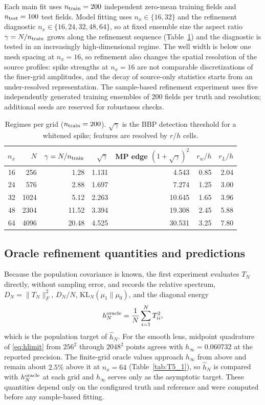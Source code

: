 \documentclass[11pt]{article}
\numberwithin{table}{section}
\numberwithin{figure}{section}
\begin{document}
Each main fit uses $n_{\rm train}=200$ independent zero-mean training fields and $n_{\rm test}=100$ test fields. Model fitting uses $n_x\in\{16,32\}$ and the refinement diagnostic $n_x\in\{16,24,32,48,64\}$, so at fixed ensemble size the aspect ratio $\gamma=N/n_{\rm train}$ grows along the refinement sequence (Table~\ref{tab:regimes}) and the diagnostic is tested in an increasingly high-dimensional regime. The well width is below one mesh spacing at $n_x=16$, so refinement also changes the spatial resolution of the source profiles: spike strengths at $n_x=16$ are not comparable discretizations of the finer-grid amplitudes, and the decay of source-only statistics starts from an under-resolved representation. The sample-based refinement experiment uses five independently generated training ensembles of 200 fields per truth and resolution; additional seeds are reserved for robustness checks.

\begin{table}[htbp]
\centering
\caption{Regimes per grid ($n_{\rm train}=200$). $\sqrt\gamma$ is the BBP detection threshold for a
whitened spike; features are resolved by $r/h$ cells.}
\label{tab:regimes}
\begin{tabular}{@{}rrrrrrr@{}}
\toprule
$n_x$ & $N$ & $\gamma=N/n_{\rm train}$ & $\sqrt\gamma$ & MP edge $(1+\sqrt\gamma)^2$ & $r_w/h$ & $r_L/h$ \\
\midrule
16 & 256  & 1.28  & 1.131 & 4.543  & 0.85 & 2.04 \\
24 & 576  & 2.88  & 1.697 & 7.274  & 1.25 & 3.00 \\
32 & 1024 & 5.12  & 2.263 & 10.645 & 1.65 & 3.96 \\
48 & 2304 & 11.52 & 3.394 & 19.308 & 2.45 & 5.88 \\
64 & 4096 & 20.48 & 4.525 & 30.531 & 3.25 & 7.80 \\
\bottomrule
\end{tabular}
\end{table}

\subsection{Oracle refinement quantities and predictions}
\label{sec:oracle_design}

Because the population covariance is known, the first experiment evaluates $T_N$ directly, without sampling error, and records the relative spectrum, $D_N=\|T_N\|_F^2$, $D_N/N$, $\mathrm{KL}_N(\mu_1\|\mu_0)$, and the diagonal energy
\begin{equation}
    h_N^{\rm oracle}
    =
    \frac1N\sum_{i=1}^{N}T_{ii}^2,
    \label{eq:oracle_hN_design}
\end{equation}
which is the population target of $\widehat h_N$. For the smooth lens, midpoint quadrature of \eqref{eq:hlimit} from $256^2$ through $2048^2$ points agrees with $h_\infty=0.060732$ at the reported precision. The finite-grid oracle values approach $h_\infty$ from above and remain about $2.5\%$ above it at $n_x=64$ (Table~\ref{tab:T5_1}), so $\widehat h_N$ is compared with $h_N^{\rm oracle}$ at each grid and $h_\infty$ serves only as the asymptotic target. These quantities depend only on the configured truth and reference and were computed before any sample-based fitting.
\end{document}
